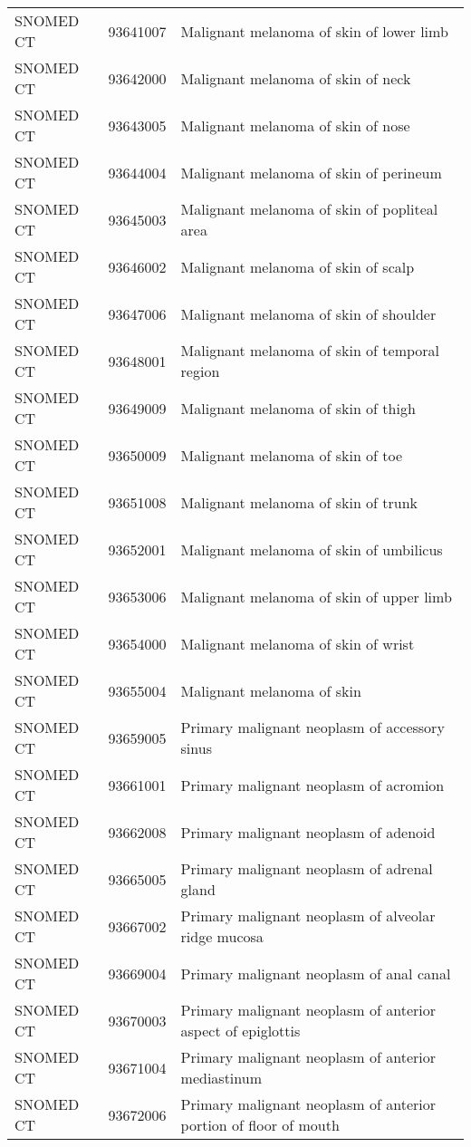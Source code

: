 \begin{longtable}{p{}p{}p{}}
  SNOMED CT & 93641007 & Malignant melanoma of skin of lower limb \\ 
  SNOMED CT & 93642000 & Malignant melanoma of skin of neck \\ 
  SNOMED CT & 93643005 & Malignant melanoma of skin of nose \\ 
  SNOMED CT & 93644004 & Malignant melanoma of skin of perineum \\ 
  SNOMED CT & 93645003 & Malignant melanoma of skin of popliteal area \\ 
  SNOMED CT & 93646002 & Malignant melanoma of skin of scalp \\ 
  SNOMED CT & 93647006 & Malignant melanoma of skin of shoulder \\ 
  SNOMED CT & 93648001 & Malignant melanoma of skin of temporal region \\ 
  SNOMED CT & 93649009 & Malignant melanoma of skin of thigh \\ 
  SNOMED CT & 93650009 & Malignant melanoma of skin of toe \\ 
  SNOMED CT & 93651008 & Malignant melanoma of skin of trunk \\ 
  SNOMED CT & 93652001 & Malignant melanoma of skin of umbilicus \\ 
  SNOMED CT & 93653006 & Malignant melanoma of skin of upper limb \\ 
  SNOMED CT & 93654000 & Malignant melanoma of skin of wrist \\ 
  SNOMED CT & 93655004 & Malignant melanoma of skin \\ 
  SNOMED CT & 93659005 & Primary malignant neoplasm of accessory sinus \\ 
  SNOMED CT & 93661001 & Primary malignant neoplasm of acromion \\ 
  SNOMED CT & 93662008 & Primary malignant neoplasm of adenoid \\ 
  SNOMED CT & 93665005 & Primary malignant neoplasm of adrenal gland \\ 
  SNOMED CT & 93667002 & Primary malignant neoplasm of alveolar ridge mucosa \\ 
  SNOMED CT & 93669004 & Primary malignant neoplasm of anal canal \\ 
  SNOMED CT & 93670003 & Primary malignant neoplasm of anterior aspect of epiglottis \\ 
  SNOMED CT & 93671004 & Primary malignant neoplasm of anterior mediastinum \\ 
  SNOMED CT & 93672006 & Primary malignant neoplasm of anterior portion of floor of mouth \\ 

\end{longtable}
